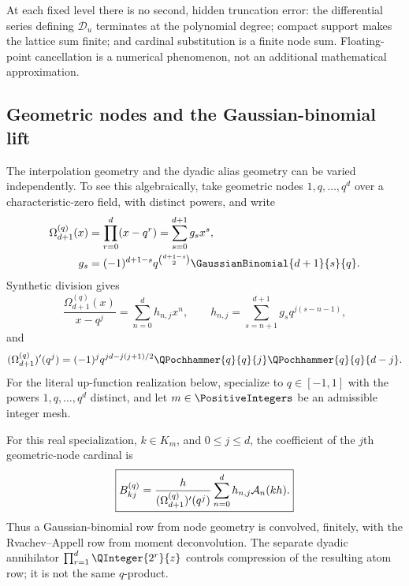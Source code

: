 At each fixed level there is no second, hidden truncation error: the
differential series defining $\mathscr D_u$ terminates at the polynomial
degree; compact support makes the lattice sum finite; and cardinal
substitution is a finite node sum.  Floating-point cancellation is a
numerical phenomenon, not an additional mathematical approximation.

\subsection{Geometric nodes and the Gaussian-binomial lift}

The interpolation geometry and the dyadic alias geometry can be varied
independently.  To see this algebraically, take geometric nodes
$1,q,\ldots,q^d$ over a characteristic-zero field, with distinct powers, and
write
\begin{align}
 \Omega_{d+1}^{(q)}(x)&=\prod_{r=0}^{d}(x-q^r)
 =\sum_{s=0}^{d+1}g_sx^s,
 \label{eq:lag-q-product}\\
 g_s&=(-1)^{d+1-s}q^{\binom{d+1-s}{2}}
 \GaussianBinomial{d+1}{s}{q}.
 \label{eq:lag-q-coeff}
\end{align}
Synthetic division gives
\begin{equation}
 \frac{\Omega_{d+1}^{(q)}(x)}{x-q^j}
 =\sum_{n=0}^{d}h_{n,j}x^n,
 \qquad
 h_{n,j}=\sum_{s=n+1}^{d+1}g_sq^{j(s-n-1)},
 \label{eq:lag-q-synthetic}
\end{equation}
and
\begin{equation}
 (\Omega_{d+1}^{(q)})'(q^j)=(-1)^j
 q^{jd-j(j+1)/2}\QPochhammer{q}{q}{j}\QPochhammer{q}{q}{d-j}.
 \label{eq:lag-q-denominator}
\end{equation}
For the literal up-function realization below, specialize to
$q\in[-1,1]$ with the powers $1,q,\ldots,q^d$ distinct, and let
$m\in\PositiveIntegers$ be an admissible integer mesh.

\begin{proposition}
\label{prop:lag-q-lift}
For this real specialization, $k\in K_m$, and $0\le j\le d$, the coefficient of the
$j$th geometric-node cardinal is
\begin{equation}
 \boxed{
 B_{kj}^{(q)}=
 \frac{h}{(\Omega_{d+1}^{(q)})'(q^j)}
 \sum_{n=0}^{d}h_{n,j}\mathcal A_n(kh).}
 \label{eq:lag-q-lift}
\end{equation}
Thus a Gaussian-binomial row from node geometry is convolved, finitely, with
the Rvachev--Appell row from moment deconvolution.  The separate dyadic
annihilator $\prod_{r=1}^{d}\QInteger{2^r}{z}$ controls compression of the resulting
atom row; it is not the same $q$-product.
\end{proposition}

